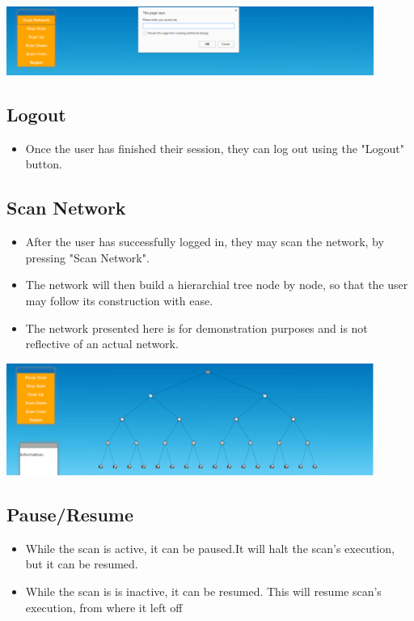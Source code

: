 \documentclass[hidelinks,a4paper,12pt]{article}
\begin{document}
		\begin{center}
			\includegraphics[width=0.9\textwidth]{./images/LoginTwo.png}
		\end{center}
		

	\subsection{Logout}
		\begin {itemize}
			\item Once the user has finished their session, they can log out using the "Logout" button.
		\end{itemize}
	\newpage
	
	\subsection{Scan Network}
		\begin {itemize}
			\item After the user has successfully logged in, they may scan the network, by pressing "Scan Network".
			\item The network will then build a hierarchial tree node by node, so that the user may follow its construction with ease.
			\item The network presented here is for demonstration purposes and is not reflective of an actual network.
		\end{itemize}
		\begin{center}
			\includegraphics[width=0.9\textwidth]{./images/PostScanLaunch.png}
			\end{center}	
		
	
		
	\subsection{Pause/Resume}
	\begin {itemize}
	\item While the scan is active, it can be paused.It will halt the scan's execution, but it can be resumed.
	\item While the scan is is inactive, it can be resumed. This will resume scan's execution, from where it left off
	\end{itemize}
	
\end{document}
